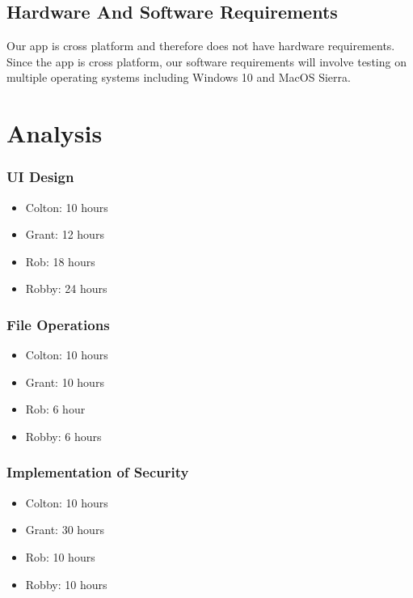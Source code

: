 \documentclass[11pt]{report}
\begin{document}
\section{Hardware And Software Requirements}
Our app is cross platform and therefore does not have hardware requirements. 
Since the app is cross platform, our software requirements will involve 
testing on multiple operating systems including Windows 10 and MacOS Sierra.



\chapter{Analysis}

\subsection*{UI Design}
\begin{itemize}
    \item Colton: 10 hours
    \item Grant: 12 hours
    \item Rob: 18 hours
    \item Robby: 24 hours
\end{itemize}

\subsection*{File Operations}
\begin{itemize}
    \item Colton: 10 hours
    \item Grant: 10 hours
    \item Rob:  6 hour
    \item Robby: 6 hours
\end{itemize}

\subsection*{Implementation of Security}
\begin{itemize}
    \item Colton: 10 hours
    \item Grant: 30 hours
    \item Rob: 10 hours
    \item Robby: 10 hours
\end{itemize}
\end{document}
